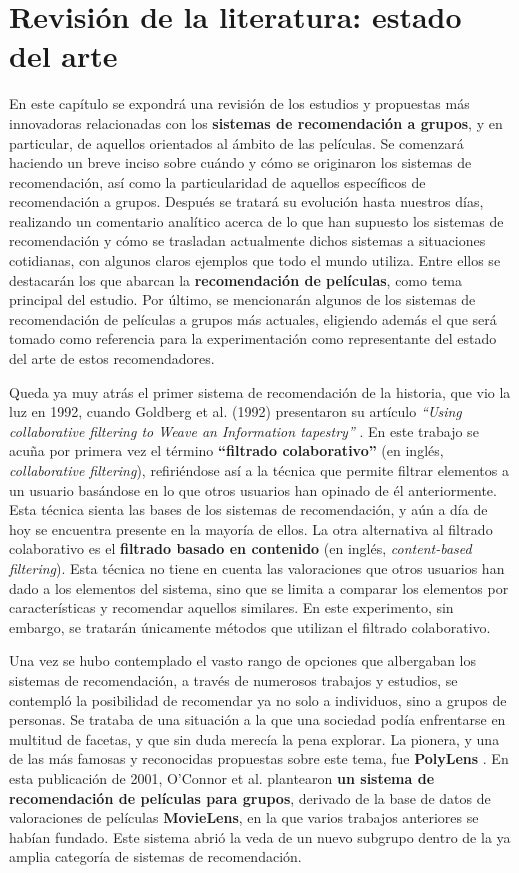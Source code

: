 \chapter{Revisión de la literatura: estado del arte}

En este capítulo se expondrá una revisión de los estudios y propuestas más innovadoras relacionadas con los \textbf{sistemas de recomendación a grupos}, y en particular, de aquellos orientados al ámbito de las películas. Se comenzará haciendo un breve inciso sobre cuándo y cómo se originaron los sistemas de recomendación, así como la particularidad de aquellos específicos de recomendación a grupos. Después se tratará su evolución hasta nuestros días, realizando un comentario analítico acerca de lo que han supuesto los sistemas de recomendación y cómo se trasladan actualmente dichos sistemas a situaciones cotidianas, con algunos claros ejemplos que todo el mundo utiliza. Entre ellos se destacarán los que abarcan la \textbf{recomendación de películas}, como tema principal del estudio. Por último, se mencionarán algunos de los sistemas de recomendación de películas a grupos más actuales, eligiendo además el que será tomado como referencia para la experimentación como representante del estado del arte de estos recomendadores.

Queda ya muy atrás el primer sistema de recomendación de la historia, que vio la luz en 1992, cuando Goldberg et al. (1992) presentaron su artículo \textit{``Using collaborative filtering to Weave an Information tapestry''} \cite{tapestry-goldberg}. En este trabajo se acuña por primera vez el término \textbf{``filtrado colaborativo''} (en inglés, \textit{collaborative filtering}), refiriéndose así a la técnica que permite filtrar elementos a un usuario basándose en lo que otros usuarios han opinado de él anteriormente. Esta técnica sienta las bases de los sistemas de recomendación, y aún a día de hoy se encuentra presente en la mayoría de ellos. La otra alternativa al filtrado colaborativo es el \textbf{filtrado basado en contenido} (en inglés, \textit{content-based filtering}). Esta técnica no tiene en cuenta las valoraciones que otros usuarios han dado a los elementos del sistema, sino que se limita a comparar los elementos por características y recomendar aquellos similares. En este experimento, sin embargo, se tratarán únicamente métodos que utilizan el filtrado colaborativo.

Una vez se hubo contemplado el vasto rango de opciones que albergaban los sistemas de recomendación, a través de numerosos trabajos y estudios, se contempló la posibilidad de recomendar ya no solo a individuos, sino a grupos de personas. Se trataba de una situación a la que una sociedad podía enfrentarse en multitud de facetas, y que sin duda merecía la pena explorar. La pionera, y una de las más famosas y reconocidas propuestas sobre este tema, fue \textbf{PolyLens} \cite{polylens}. En esta publicación de 2001, O'Connor et al. plantearon \textbf{un sistema de recomendación de películas para grupos}, derivado de la base de datos de valoraciones de películas \textbf{MovieLens}, en la que varios trabajos anteriores se habían fundado. Este sistema abrió la veda de un nuevo subgrupo dentro de la ya amplia categoría de sistemas de recomendación.

